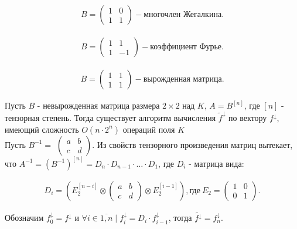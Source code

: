\begin{align*}
    B = 
    \begin{pmatrix}
        1 & 0\\
        1 & 1
    \end{pmatrix}
    - \text{многочлен Жегалкина}.
\end{align*}

\begin{align*}
    B = 
    \begin{pmatrix}
        1 & 1\\
        1 & -1
    \end{pmatrix}
    - \text{коэффициент Фурье}.
\end{align*}

\begin{align*}
    B = 
    \begin{pmatrix}
        1 & 1\\
        1 & 1
    \end{pmatrix}
    - \text{вырожденная матрица}.
\end{align*}

\thr Пусть $B$ - невырожденная матрица размера $2 \times 2$  над $K$, $A = B^{[n]}$, где $[n]$ - тензорная степень. Тогда существует алгоритм вычисления $\widetilde{f}^\downarrow$ по вектору $f^\downarrow$, имеющий сложность $O(n \cdot 2^n)$ операций поля $K$\\

\proof Пусть $B^{-1} = $ $\begin{pmatrix}
        a & b\\
        c & d
    \end{pmatrix}$.
Из свойств тензорного произведения матриц вытекает, что $A^{-1} = (B^{-1})^{[n]}= D_n \cdot D_{n-1} \cdot \ldots \cdot D_1$, где $D_i$ - матрица вида:

\begin{align*}
    D_i = \left( E_2^{[n-i]} \otimes
    \begin{pmatrix}
        a & b\\
        c & d
    \end{pmatrix}
    \otimes E_2^{[i-1]} \right), \text{где}\  E_2 = 
    \begin{pmatrix}
        1 & 0 \\
        0 & 1
    \end{pmatrix}.
\end{align*}

Обозначим $f_0^\downarrow = f^\downarrow$ и $\forall i \in \overline{1,n} \mid f_i^\downarrow = D_i \cdot f_{i-1}^\downarrow$, тогда $\widetilde{f^\downarrow} = f_n^\downarrow$.

